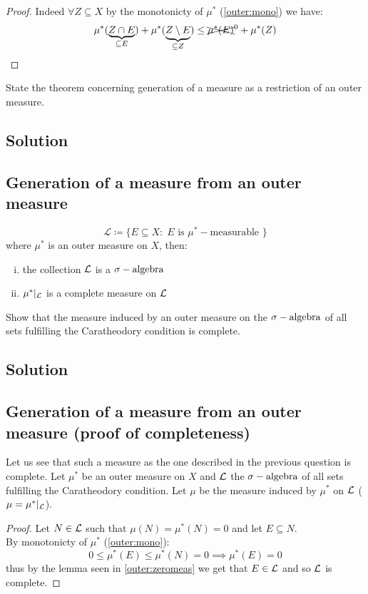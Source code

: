 \begin{proof}\label{outer:zeromeas}
    Indeed $\forall Z \subseteq X$ by the monotonicty of $\mu^*$ (\ref{outer:mono}) we have:
    \[
        \mu^*(\underbrace{Z\cap E}_{\subseteq E}) + \mu^*(\underbrace{Z\setminus E}_{\subseteq Z}) \leq \xcancel{\mu^*(E)}^0 + \mu^*(Z)
    \]
\end{proof}



\question
State the theorem concerning generation of a measure as a restriction of an outer measure.

\subsection*{Solution}
\subsection{Generation of a measure from an outer measure}\label{meas:gen}
\provdef[$\mathcal{L}$]
\[
    \mathcal{L} \coloneqq \{ E\subseteq X : \; E \text{ is } \mu^*-\text{measurable } \}
\]
where $\mu^*$ is an outer measure on $X$, then:
\begin{enumerate}[i)]
    \item the collection $\mathcal{L}$ is a $\sigma-\text{algebra}$
    \item $\mu^* |_{\mathcal{L}}$ is a complete measure on $\mathcal{L}$
\end{enumerate}


\question
Show that the measure induced by an outer measure on the $\sigma-\text{algebra}$ of all sets fulfilling the
Caratheodory condition is complete.

\subsection*{Solution}
\subsection{Generation of a measure from an outer measure (proof of completeness)}
Let us see that such a measure as the one described in the previous question is complete. Let $\mu^*$ be an outer measure on $X$ and $\mathcal{L}$ the $\sigma-\text{algebra}$ of all sets fulfilling the Caratheodory condition. Let $\mu$ be the measure induced by $\mu^*$ on $\mathcal{L}$ ($\mu=\mu^* |_{\mathcal{L}}$).
\begin{proof}
    Let $N\in\mathcal{L}$ such that $\mu(N)=\mu^*(N)=0$ and let $E\subseteq N$.\\
    By monotonicty of $\mu^*$ (\ref{outer:mono}):
    \[
        0\leq \mu^*(E)\leq \mu^*(N)=0 \implies \mu^*(E)=0
    \]
    thus by the lemma seen in \ref{outer:zeromeas} we get that $E\in\mathcal{L}$ and so $\mathcal{L}$ is complete.
\end{proof}

